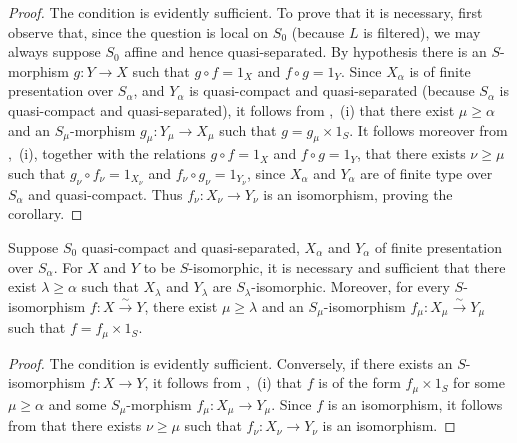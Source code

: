 \begin{proof}
The condition is evidently sufficient. To prove that it is necessary, first observe that, since the question is local on $S_0$ (because $L$ is filtered), we may always suppose $S_0$ affine and hence quasi-separated. By hypothesis there is an $S$-morphism $g:Y\to X$ such that $g\circ f=1_X$ and $f\circ g=1_Y$. Since $X_\alpha$ is of finite presentation over $S_\alpha$, and $Y_\alpha$ is quasi-compact and quasi-separated (because $S_\alpha$ is quasi-compact and quasi-separated), it follows from ,~(i) that there exist $\mu\geqslant\alpha$ and an $S_\mu$-morphism $g_\mu:Y_\mu\to X_\mu$ such that $g=g_\mu\times 1_S$. It follows moreover from ,~(i), together with the relations $g\circ f=1_X$ and $f\circ g=1_Y$, that there exists $\nu\geqslant\mu$ such that $g_\nu\circ f_\nu=1_{X_\nu}$ and $f_\nu\circ g_\nu=1_{Y_\nu}$, since $X_\alpha$ and $Y_\alpha$ are of finite type over $S_\alpha$ and quasi-compact. Thus $f_\nu:X_\nu\to Y_\nu$ is an isomorphism, proving the corollary.
\end{proof}

\begin{corollary}[8.8.2.5]
\label{IV.8.8.2.5}
Suppose $S_0$ quasi-compact and quasi-separated, $X_\alpha$ and $Y_\alpha$ of finite presentation over $S_\alpha$.
For $X$ and $Y$ to be $S$-isomorphic, it is necessary and sufficient that there exist $\lambda\geqslant\alpha$ such that $X_\lambda$ and $Y_\lambda$ are $S_\lambda$-isomorphic. Moreover, for every $S$-isomorphism $f:X\xrightarrow{\sim}Y$, there exist $\mu\geqslant\lambda$ and an $S_\mu$-isomorphism $f_\mu:X_\mu\xrightarrow{\sim}Y_\mu$ such that $f=f_\mu\times 1_S$.
\end{corollary}

\begin{proof}
The condition is evidently sufficient. Conversely, if there exists an $S$-isomorphism $f:X\to Y$, it follows from ,~(i) that $f$ is of the form $f_\mu\times 1_S$ for some $\mu\geqslant\alpha$ and some $S_\mu$-morphism $f_\mu:X_\mu\to Y_\mu$. Since $f$ is an isomorphism, it follows from  that there exists $\nu\geqslant\mu$ such that $f_\nu:X_\nu\to Y_\nu$ is an isomorphism.
\end{proof}

